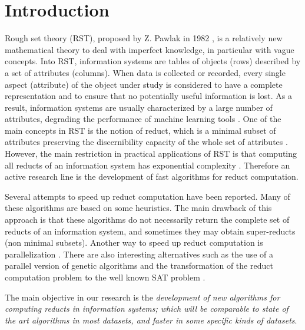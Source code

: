 \documentclass[authoryear,11pt]{elsarticle}
\begin{document}
\section{Introduction}
  Rough set theory (RST), proposed by Z. Pawlak in 1982 \citep{Pawlak81,Pawlak81-2,Pawlak82,Pawlak91}, 
  is a relatively new mathematical theory to deal with imperfect knowledge, in particular with vague 
  concepts. Into RST, information systems are tables of objects (rows) described by a set of attributes (columns). 
  When data is collected or recorded, every single aspect (attribute) of the object under study is considered 
  to have a complete representation and to ensure that no potentially useful information is lost.
  As a result, information systems are usually characterized by a large number of attributes,
  degrading the performance of machine learning tools \citep{Parthalain08}.
  One of the main concepts in RST is the notion of reduct, which is a minimal subset of attributes 
  preserving the discernibility capacity of the whole set of attributes \citep{Pawlak91}. 
  However, the main restriction in practical applications of RST is that computing all reducts of an information 
  system has exponential complexity \citep{Skowron92}. Therefore an active research line is the development 
  of fast algorithms for reduct computation.
  
  Several attempts to speed up reduct computation have been reported. Many of these algorithms are based on some heuristics. The main drawback of this approach is that these algorithms do not necessarily return the complete set of reducts of an information system, and sometimes they may obtain super-reducts (non minimal subsets). Another way to speed up reduct computation is parallelization \citep{Strakowski08}. There are also interesting alternatives such as the use of a parallel version of genetic algorithms \citep{Wroblewski98} and the transformation of the reduct computation problem to the well known SAT problem \citep{Jensen14}.  
  
  The main objective in our research is the \emph{development of new algorithms for computing reducts in  	information systems; which will be comparable to state of the art algorithms in most datasets, and faster in some specific kinds of datasets}. 
  
\end{document}

